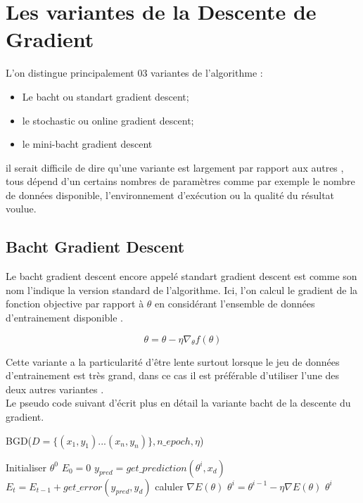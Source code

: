 \documentclass[12pt,a4paper]{article}
\begin{document}
\section{Les variantes de la Descente de Gradient}  

L'on distingue principalement 03 variantes de l'algorithme : \\
\begin{itemize}
\item Le bacht ou standart gradient descent; \\

\item le stochastic ou online gradient descent; \\

\item le mini-bacht gradient descent \\

\end{itemize} il serait difficile de dire qu'une variante est largement par rapport aux autres , tous dépend d'un certains nombres de paramètres comme par exemple le nombre de données disponible, l'environnement d'exécution ou la qualité du résultat voulue. \\

\subsection{Bacht Gradient Descent}

Le bacht gradient descent encore appelé standart gradient descent est comme son nom l'indique la version standard de l'algorithme. Ici, l'on calcul le gradient de la fonction objective par rapport à $\theta$ en considérant l'ensemble de données d'entrainement disponible .
\vspace{0.2in}
\begin{large}
\begin{equation}
\theta = \theta - \eta \nabla_{\theta}f(\theta)
\end{equation}
\end{large}

Cette variante a la particularité d'être lente surtout lorsque le jeu de données d'entrainement est très grand, dans ce cas il est préférable d'utiliser l'une des deux autres variantes . \\
Le pseudo code suivant d'écrit plus en détail la variante bacht de la descente du gradient.

\begin{center}
\begin{algorithm}[H]
\caption{BGD($ D = \lbrace (x_{1},y_{1})...(x_{n},y_{n}) \rbrace, n\_epoch, \eta$)}
\begin{algorithmic} 
\STATE Initialiser $\theta^{0}$
\STATE $E_{0} = 0$
\STATE $y_{pred} = get\_prediction(\theta^{i}, x_{d})$
\STATE $E_{t} = E_{t-1} + get\_error(y_{pred}, y_{d})$
\ENDFOR
\STATE caluler $\nabla E(\theta )$
\STATE $\theta^{i} = \theta^{i-1} - \eta\nabla E(\theta ) $
\ENDFOR
\RETURN $\theta^{i}$
\end{algorithmic}
\end{algorithm}
\end{center}
\end{document}
